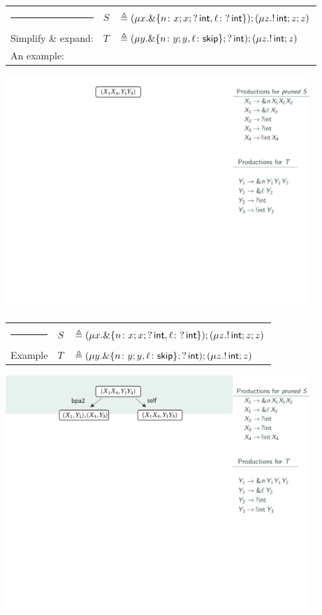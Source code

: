 \documentclass[10pt]{beamer}
\begin{document}
\begin{frame}
	\begin{tabular} {l l l }
		{\color{teal}\rule{3cm}{2pt}} &  $S$ &$\triangleq (\mu x. \&\{n\colon x;x;?\,\mathsf{int},
     	 \ell\colon ?\,\mathsf{int} \});( \mu z. !\,\mathsf{int}; z;z )$\\
 		{\color{teal} Simplify \& expand:}  &  $T$ &$\triangleq (\mu y. \&\{n\colon y;y,
     	 \ell\colon \mathsf{skip} \}; ?\,\mathsf{int}); (\mu z. !\,\mathsf{int}; z)$\\
 		{\color{teal} An example:}&&
	\end{tabular}
	\vspace*{2mm}
	\includegraphics[width=11.5cm]{img/exemplo-9}\smallskip
\end{frame}

\begin{frame}
	\begin{tabular} {l l l }
  		{\color{teal}\rule{3cm}{2pt}} &  $S$ &$\triangleq (\mu x. \&\{n\colon x;x;?\,\mathsf{int},
      	\ell\colon ?\,\mathsf{int} \});( \mu z. !\,\mathsf{int}; z;z )$\\
  	{\color{teal} Example}  &  $T$ &$\triangleq (\mu y. \&\{n\colon y;y,
      \ell\colon \mathsf{skip} \}; ?\,\mathsf{int}); (\mu z. !\,\mathsf{int}; z)$
	\end{tabular}
	\vspace*{2mm}
	\includegraphics[width=11.5cm]{img/exemplo-8}\smallskip
\end{frame}
\end{document}
